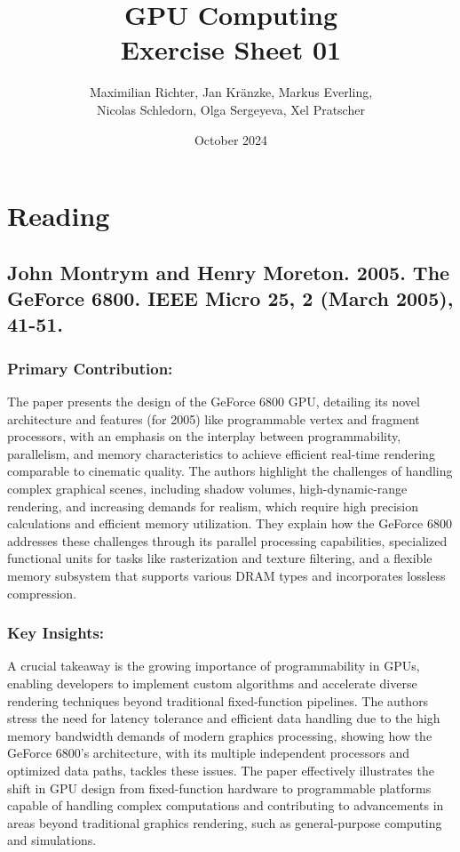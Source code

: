\documentclass[12pt]{article}
\title{\vspace{-3cm}\textbf{GPU Computing}\\ \vspace{0.5cm}\large{Exercise Sheet 01}}
\author{\small{Maximilian Richter, Jan Kränzke, Markus Everling,}\\ \small{Nicolas Schledorn, Olga Sergeyeva, Xel Pratscher}}
\date{October 2024}
\begin{document}
\maketitle
\section{Reading}
\subsection{John Montrym and Henry Moreton. 2005. The GeForce 6800. IEEE Micro 25, 2 (March 2005), 41-51.}
\subsubsection{Primary Contribution:}
The paper presents the design of the GeForce 6800 GPU, detailing its novel architecture and features (for 2005) like programmable vertex and fragment processors,  with an emphasis on the interplay between programmability, parallelism, and memory characteristics to achieve efficient real-time rendering comparable to cinematic quality. The authors highlight the challenges of handling complex graphical scenes, including shadow volumes, high-dynamic-range rendering, and increasing demands for realism, which require high precision calculations and efficient memory utilization. They explain how the GeForce 6800 addresses these challenges through its parallel processing capabilities, specialized functional units for tasks like rasterization and texture filtering, and a flexible memory subsystem that supports various DRAM types and incorporates lossless compression.

\subsubsection{Key Insights:}
A crucial takeaway is the growing importance of programmability in GPUs, enabling developers to implement custom algorithms and accelerate diverse rendering techniques beyond traditional fixed-function pipelines.  The authors stress the need for latency tolerance and efficient data handling due to the high memory bandwidth demands of modern graphics processing, showing how the GeForce 6800's architecture, with its multiple independent processors and optimized data paths, tackles these issues.  The paper effectively illustrates the shift in GPU design from fixed-function hardware to programmable platforms capable of handling complex computations and contributing to advancements in areas beyond traditional graphics rendering, such as general-purpose computing and simulations.
\end{document}
